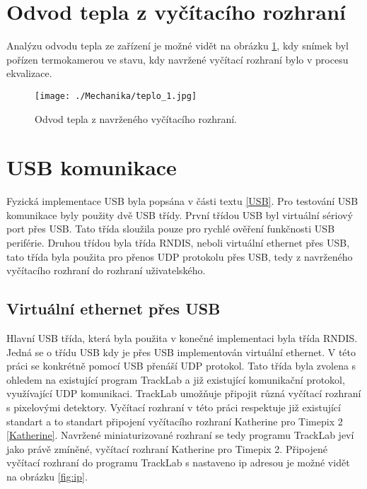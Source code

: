 \section{Odvod tepla z vyčítacího rozhraní}
Analýzu odvodu tepla ze zařízení je možné vidět na obrázku \ref{fig:teplo}, kdy snímek byl pořízen termokamerou ve stavu, kdy navržené vyčítací rozhraní bylo v procesu ekvalizace.
\begin{figure}[h!]
	\centering
	\captionsetup{justification=centering}
	\texttt{[image: ./Mechanika/teplo\_1.jpg]}
	\caption{Odvod tepla z navrženého vyčítacího rozhraní.} 
	\label{fig:teplo}
\end{figure}

\section{USB komunikace}
Fyzická implementace USB byla popsána v části textu \ref{USB}. Pro testování USB komunikace byly použity dvě USB třídy. První třídou USB byl virtuální sériový port přes USB. Tato třída sloužila pouze pro rychlé ověření funkčnosti USB periférie. Druhou třídou byla třída RNDIS, neboli virtuální ethernet přes USB, tato třída byla použita pro přenos UDP protokolu přes USB, tedy z navrženého vyčítacího rozhraní do rozhraní uživatelského.
\subsection{Virtuální ethernet přes USB}
Hlavní USB třída, která byla použita v konečné implementaci byla třída RNDIS. Jedná se o třídu USB kdy je přes USB implementován virtuální ethernet. V této práci se konkrétně pomocí USB přenáší UDP protokol. Tato třída byla zvolena s ohledem na existující program TrackLab \cite{Manek_2024} a již existující komunikační protokol, využívající UDP komunikaci. TrackLab umožňuje připojit různá vyčítací rozhraní s pixelovými detektory. Vyčítací rozhraní v této práci respektuje již existující standart a to standart připojení vyčítacího rozhraní Katherine pro Timepix 2 \ref{Katherine}. Navržené miniaturizované rozhraní se tedy programu TrackLab jeví jako právě zmíněné, vyčítací rozhraní Katherine pro Timepix 2. Připojené vyčítací rozhraní do programu TrackLab s nastaveno ip adresou je možné vidět na obrázku \ref{fig:ip}.


